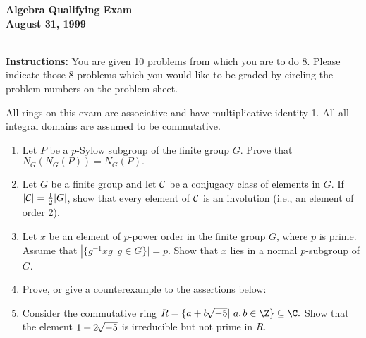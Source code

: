 \documentclass{article}
\begin{document}
\begin{Large}






\begin{center}\begin{LARGE}
{\bf  Algebra Qualifying Exam}\\ 
{\bf August 31, 1999}\\ \end{LARGE}
\end{center}
\vspace{0.1in}
\noindent\hrulefill\\
{\bf Instructions:} You are given 10 problems from which you are to do 8.
 Please indicate those  8 problems which you would like  to be graded 
by circling the problem numbers on the  problem sheet. 

 All rings on this exam are associative and
have multiplicative identity 1. All all integral domains are 
assumed to be commutative.
\vspace{0.2in}

\vs


\begin{enumerate}

\item Let $P$ be a $p$-Sylow subgroup of the finite group $G$.
Prove that $N_G(N_G(P))=N_G(P).$

\item Let $G$ be a finite group and let ${\cal C}$ be a conjugacy class
of elements in $G$.  If $|{\cal C}|=\frac{1}{2}|G|$, show that every
element of ${\cal C}$ is an involution (i.e., an element of order 2).

\item Let $x$ be an element of $p$-power order in the 
finite group $G$, where $p$
is prime. Assume that $|\{g^{-1}xg|\ g\in G\}|=p$. Show that $x$ lies in
a normal $p$-subgroup of $G$.

\item Prove, or give a counterexample to the assertions below:

\item Consider the commutative ring $R=\{a+b\,\root\of{-5}|\ a,b\in
\Z\}
\subseteq \C.$  Show that the element $1+2\,\root\of{-5}$ is
irreducible but not prime in $R$.



\end{enumerate}
\end{Large}
\end{document}
